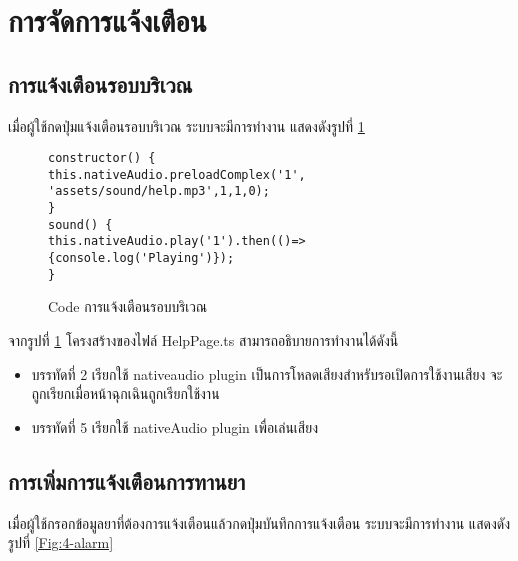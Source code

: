 
\section{การจัดการแจ้งเตือน}


\subsection{การแจ้งเตือนรอบบริเวณ}
เมื่อผู้ใช้กดปุ่มแจ้งเตือนรอบบริเวณ ระบบจะมีการทำงาน แสดงดังรูปที่ \ref{Fig:4-danger}

\begin{figure}[H]
{\lstset{language=Pascal}
\begin{lstlisting}
constructor() {
this.nativeAudio.preloadComplex('1', 'assets/sound/help.mp3',1,1,0);
}
sound() {
this.nativeAudio.play('1').then(()=>{console.log('Playing')});
}
\end{lstlisting}}
\caption{Code การแจ้งเตือนรอบบริเวณ}
\label{Fig:4-danger}
\end{figure}

จากรูปที่ \ref{Fig:4-danger} โครงสร้างของไฟล์ HelpPage.ts สามารถอธิบายการทำงานได้ดังนี้
\begin{itemize}[label={--}]
\item บรรทัดที่ 2 เรียกใช้ nativeaudio plugin เป็นการโหลดเสียงสำหรับรอเปิดการใช้งานเสียง จะถูกเรียกเมื่อหน้าฉุกเฉินถูกเรียกใช้งาน
\item บรรทัดที่ 5 เรียกใช้ nativeAudio plugin เพื่อเล่นเสียง
\end{itemize}
\newline



\subsection{การเพิ่มการแจ้งเตือนการทานยา}
เมื่อผู้ใช้กรอกข้อมูลยาที่ต้องการแจ้งเตือนแล้วกดปุ่มบันทึกการแจ้งเตือน ระบบจะมีการทำงาน แสดงดังรูปที่ \ref{Fig:4-alarm}

